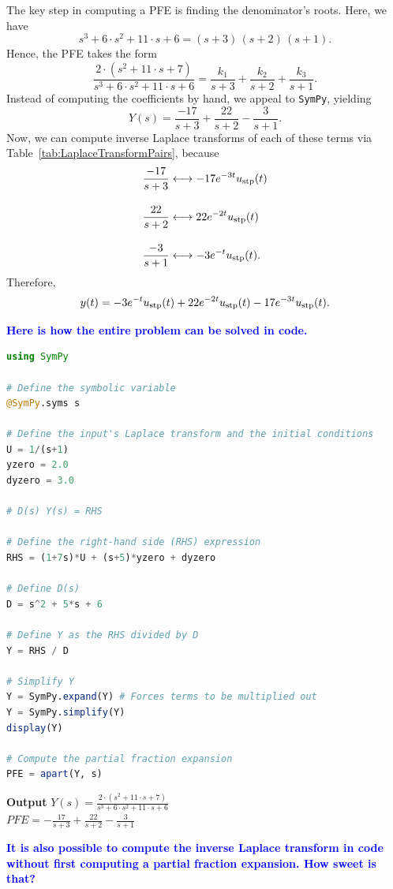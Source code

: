 The key step in computing a PFE is finding the denominator's roots. Here, we have 
$$ s^{3} + 6 \cdot s^{2} + 11 \cdot s + 6 = (s+3)\, (s+2) \, (s+1).$$
Hence, the PFE takes the form 
$$\frac{2 \cdot \left( s^{2} + 11 \cdot s + 7 \right)}{s^{3} + 6 \cdot s^{2} + 11 \cdot s + 6} = \frac{k_1}{s+3} + \frac{k_2}{s+2} + \frac{k_3}{s+1}.$$
Instead of computing the coefficients by hand, we appeal to \texttt{SymPy}, yielding
$$ Y(s) = \frac{-17}{s + 3} + \frac{22}{s + 2} - \frac{3}{s + 1}.$$
Now, we can compute inverse Laplace transforms of each of these terms via Table~\ref{tab:LaplaceTransformPairs}, because
\begin{align*}
     \frac{-17}{s + 3} & \longleftrightarrow -17 e^{-3t} u_{\rm stp}(t) \\[1em]
    \frac{22}{s + 2} & \longleftrightarrow 22 e^{-2t} u_{\rm stp}(t) \\[1em]
    \frac{-3}{s + 1} & \longleftrightarrow -3 e^{-t} u_{\rm stp}(t). 
\end{align*}
Therefore, 
$$y(t) = -3  e^{-t} u_{\rm stp}(t) + 22 e^{-2t} u_{\rm stp}(t)  - 17 e^{-3t} u_{\rm stp}(t).$$

\textcolor{blue}{\bf \large Here is how the entire problem can be solved in code.}

\begin{lstlisting}[language=Julia,style=mystyle]
using SymPy

# Define the symbolic variable
@SymPy.syms s 

# Define the input's Laplace transform and the initial conditions
U = 1/(s+1)
yzero = 2.0
dyzero = 3.0

# D(s) Y(s) = RHS

# Define the right-hand side (RHS) expression
RHS = (1+7s)*U + (s+5)*yzero + dyzero

# Define D(s)
D = s^2 + 5*s + 6

# Define Y as the RHS divided by D
Y = RHS / D

# Simplify Y
Y = SymPy.expand(Y) # Forces terms to be multiplied out
Y = SymPy.simplify(Y)
display(Y)

# Compute the partial fraction expansion
PFE = apart(Y, s)
\end{lstlisting}
\textbf{Output} 
$Y(s) = \frac{2 \cdot \left( s^{2} + 11 \cdot s + 7 \right)}{s^{3} + 6 \cdot s^{2} + 11 \cdot s + 6}$ \\

$PFE = -\frac{17}{s + 3} + \frac{22}{s + 2} - \frac{3}{s + 1}$

\vspace*{.2cm}
\textcolor{blue}{\bf It is also possible to compute the inverse Laplace transform in code without first computing a partial fraction expansion. How sweet is that?}
\vspace*{.2cm}

